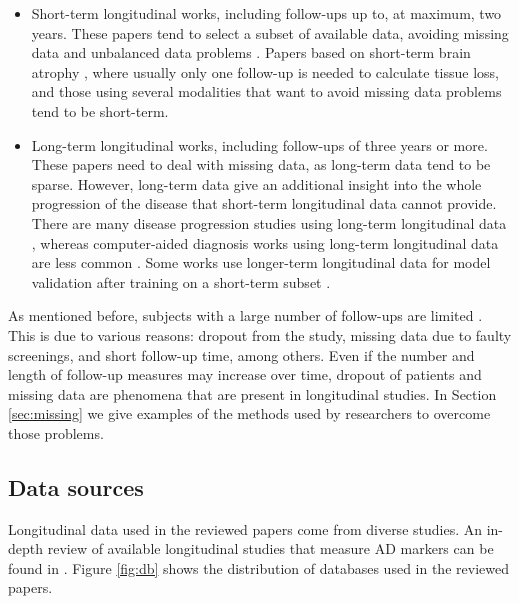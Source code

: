 \begin{itemize}\itemsep7pt

\item Short-term longitudinal works, including follow-ups up to, at maximum, two years. These papers tend to select a subset of available data, avoiding missing data and unbalanced data problems \cite{Ardekani2016,Fiot2012,Fiot2014,Gray2012,Rodrigues2014,Shi2015,Shi2017}. Papers based on short-term brain atrophy \cite{Huang2012,Hyun2016,McEvoy2011,Sanroma2017,Vounou2012}, where usually only one follow-up is needed to calculate tissue loss, and those using several modalities that want to avoid missing data problems \cite{Chen2011b,Hinrichs2011,Jack2009} tend to be short-term.

\item Long-term longitudinal works, including follow-ups of three years or more. These papers need to deal with missing data, as long-term data tend to be sparse. However, long-term data give an additional insight into the whole progression of the disease that short-term longitudinal data cannot provide. There are many disease progression studies using long-term longitudinal data \cite{Desikan2011,Guillaume2014,Guerrero2016,Bilgel2015a,Bilgel2016,Iturria-Medina2016,Li2017b,Aghili2018}, whereas computer-aided diagnosis works using long-term longitudinal data are less common \cite{Chi2017,Minhas2016}. Some works use longer-term longitudinal data for model validation after training on a short-term subset \cite{Young2015a}.
\end{itemize}

As mentioned before, subjects with a large number of follow-ups are limited \cite{Lawrence2017}. This is due to various reasons: dropout from the study, missing data due to faulty screenings, and short follow-up time, among others. Even if the number and length of follow-up measures may increase over time, dropout of patients and missing data are phenomena that are present in longitudinal studies. In Section \ref{sec:missing} we give examples of the methods used by researchers to overcome those problems. \\

\subsection{Data sources}

Longitudinal data used in the reviewed papers come from diverse studies. An in-depth review of available longitudinal studies that measure AD markers can be found in \cite{Lawrence2017}. Figure \ref{fig:db} shows the distribution of databases used in the reviewed papers.  \\

